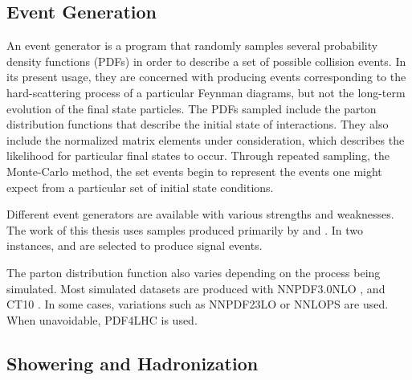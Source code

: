 \subsection{Event Generation} \label{sec:evtGen}

An event generator is a program that randomly samples several probability density functions (PDFs) in order to describe a set of possible collision events.
In its present usage, they are concerned with producing events corresponding to the hard-scattering process of a particular Feynman diagrams, but not the long-term evolution of the final state particles.
The PDFs sampled include the parton distribution functions that describe the initial state of interactions.
They also include the normalized matrix elements under consideration, which describes the likelihood for particular final states to occur.
Through repeated sampling, the Monte-Carlo method, the set events begin to represent the events one might expect from a particular set of initial state conditions.

Different event generators are available with various strengths and weaknesses.
The work of this thesis uses samples produced primarily by \sherpa \cite{Gleisberg:2008ta} and \powheg \cite{Alioli:2010xd,Frixione:2007vw}.
In two instances, \pythia \cite{pythia8} and \madgraph \cite{Alwall:2014hca} are selected to produce signal events.

The parton distribution function also varies depending on the process being simulated.
Most simulated datasets are produced with NNPDF3.0NLO \cite{Ball:2014uwa}, and CT10 \cite{ct10}.
In some cases, variations such as NNPDF23LO \cite{Ball:2012cx} or NNLOPS \cite{Hamilton:2013fea} are used.
When unavoidable, PDF4LHC \cite{Butterworth:2015oua} is used.




\subsection{Showering and Hadronization} \label{sec:hadronization}

